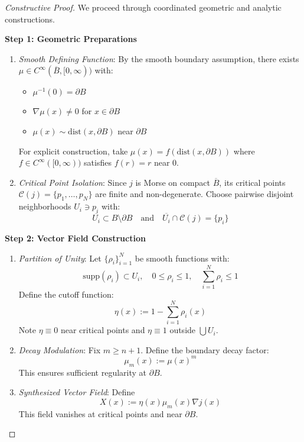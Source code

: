 \begin{proof}[Constructive Proof]
We proceed through coordinated geometric and analytic constructions.

\textbf{Step 1: Geometric Preparations}

\begin{enumerate}
\item \textit{Smooth Defining Function}: By the smooth boundary assumption, there exists \( \mu \in C^\infty(\overline{B}, [0,\infty)) \) with:
\begin{itemize}
\item \( \mu^{-1}(0) = \partial B \)
\item \( \nabla \mu(x) \neq 0 \) for \( x \in \partial B \)
\item \( \mu(x) \sim \text{dist}(x, \partial B) \) near \( \partial B \)
\end{itemize}
For explicit construction, take \( \mu(x) = f(\text{dist}(x, \partial B)) \) where \( f \in C^\infty([0,\infty)) \) satisfies \( f(r) = r \) near 0.

\item \textit{Critical Point Isolation}: Since \( j \) is Morse on compact \( \overline{B} \), its critical points \( \mathscr{C}(j) = \{p_1,\ldots,p_N\} \) are finite and non-degenerate. Choose pairwise disjoint neighborhoods \( U_i \ni p_i \) with:
\[
\overline{U_i} \subset B \setminus \partial B \quad \text{and} \quad \overline{U_i} \cap \mathscr{C}(j) = \{p_i\}
\]
\end{enumerate}

\textbf{Step 2: Vector Field Construction}

\begin{enumerate}
\item \textit{Partition of Unity}: Let \( \{\rho_i\}_{i=1}^N \) be smooth functions with:
\[
\text{supp}(\rho_i) \subset U_i, \quad 0 \leq \rho_i \leq 1, \quad \sum_{i=1}^N \rho_i \leq 1
\]
Define the cutoff function:
\[
\eta(x) := 1 - \sum_{i=1}^N \rho_i(x)
\]
Note \( \eta \equiv 0 \) near critical points and \( \eta \equiv 1 \) outside \( \bigcup U_i \).

\item \textit{Decay Modulation}: Fix \( m \geq n+1 \). Define the boundary decay factor:
\[
\mu_m(x) := \mu(x)^m
\]
This ensures sufficient regularity at \( \partial B \).

\item \textit{Synthesized Vector Field}: Define
\[
X(x) := \eta(x)\mu_m(x)\nabla j(x)
\]
This field vanishes at critical points and near \( \partial B \).
\end{enumerate}


\end{proof}
